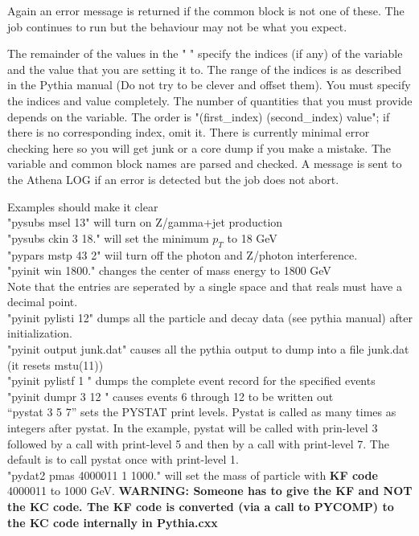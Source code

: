\documentclass[11pt]{article}
\begin{document}
Again an error message is returned if the common block is not one of
these. The job continues to run but the behaviour may not be what you
expect.

The remainder of the values in the " " specify the indices (if any) of
the variable and the value that you are setting it to. The range of
the indices is as described in the Pythia manual (Do not try to be
clever and offset them). You must specify the indices and value
completely. The number of quantities that you must provide depends on
the variable. The order is "(first\_index) (second\_index) value"; if
there is no corresponding index, omit it.
 There is currently minimal  error checking here so you will get junk or a 
core dump if you make a mistake. The variable and common block names are 
parsed and checked. A message is sent to the Athena LOG if an error is
detected but the job does not abort. 

Examples should make it clear\\

\noindent
"pysubs msel 13" will turn on Z/gamma+jet production\\
"pysubs ckin 3 18." will set the minimum $p_T$ to 18 GeV\\
"pypars mstp 43 2" wiil turn off the photon and Z/photon
interference.\\
"pyinit win 1800." changes the center of mass energy to 1800 GeV\\
Note that the entries are seperated by a single space and that reals
must have a decimal point.\\
"pyinit pylisti 12" dumps all the particle and decay data (see pythia
manual)  after initialization.\\
"pyinit output junk.dat" causes all the pythia output to dump into a
file junk.dat (it resets mstu(11))\\
"pyinit  pylistf 1 " dumps the complete event record for the specified
events\\
"pyinit dumpr 3 12 " causes events 6 through 12 to be written out\\
``pystat 3 5 7'' sets the PYSTAT print levels. Pystat is called as many times
as integers after pystat. In the example, pystat will be called with prin-level 3 followed by
a call with print-level 5 and then by a call with print-level 7. The default is to call pystat
once with print-level 1.\\
"pydat2 pmas 4000011 1 1000." will set the mass of particle with {\bf KF code} 4000011 to 1000 GeV.
{\bf WARNING: Someone has to give the KF and NOT the KC code. The KF code is converted (via a call to
PYCOMP) to the KC code internally in Pythia.cxx}\\
\end{document}
